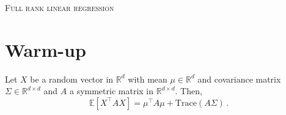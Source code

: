 \documentclass[a4paper,10pt,fleqn]{article}
\newcommand{\eqsp}{\,}
\newcommand{\rset}{\ensuremath{\mathbb{R}}}
\newcommand{\1}{\ensuremath{\mathbbm{1}}}
\newcommand{\bE}{\mathbb{E}}
\begin{document}

\noindent\hrulefill

\begin{center}
\textsc{Full rank linear regression}
\end{center}
\hrulefill

\medskip

\section{Warm-up}
Let $X$ be a random vector in $\rset^d$ with mean $\mu\in\rset^d$ and covariance matrix $\Sigma\in\rset^{d\times d}$ and $A$ a symmetric matrix in $\rset^{d\times d}$. Then,
$$
\bE[X^\top A X] = \mu^\top A \mu + \mathrm{Trace}(A\Sigma)\eqsp.
$$

%
\end{document}
